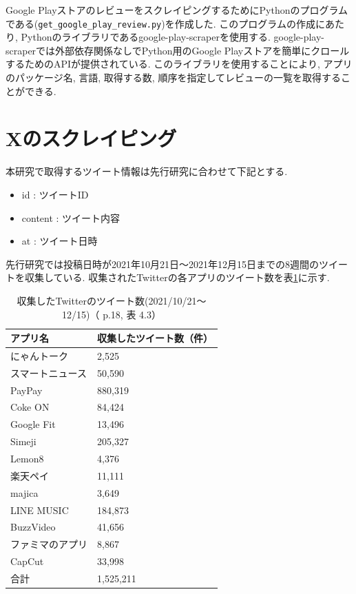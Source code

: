 Google PlayストアのレビューをスクレイピングするためにPythonのプログラムである(\verb|get_google_play_review.py|)を作成した. このプログラムの作成にあたり, Pythonのライブラリであるgoogle-play-scraperを使用する. google-play-scraperでは外部依存関係なしでPython用のGoogle Playストアを簡単にクロールするためのAPIが提供されている\cite{google-play-scraper}. 
このライブラリを使用することにより, アプリのパッケージ名, 言語, 取得する数, 順序を指定してレビューの一覧を取得することができる. 


\section{Xのスクレイピング}
\label{sec:x}
本研究で取得するツイート情報は先行研究\cite{kawatsura}に合わせて下記とする. 
\begin{itemize}
 \item id : ツイートID
 \item content : ツイート内容
 \item at : ツイート日時
\end{itemize}

先行研究では投稿日時が2021年10月21日〜2021年12月15日までの8週間のツイートを収集している. 収集されたTwitterの各アプリのツイート数を表\ref{tb:rawtweetnum}に示す. 

\begin{table}[htbp]
  \caption{収集したTwitterのツイート数(2021/10/21〜12/15)（\cite{kawatsura} p.18, 表 4.3）}
  \label{tb:rawtweetnum}
  \begin{center}
  \begin{tabular}{l|l}
    \hline
    アプリ名&収集したツイート数（件）\\\hline\hline
    にゃんトーク&2,525\\\hline
    スマートニュース&50,590\\\hline
    PayPay&880,319\\\hline
    Coke ON&84,424\\\hline
    Google Fit&13,496\\\hline
    Simeji&205,327\\\hline
    Lemon8&4,376\\\hline
    楽天ペイ&11,111\\\hline
    majica&3,649\\\hline
    LINE MUSIC&184,873\\\hline
    BuzzVideo&41,656\\\hline
    ファミマのアプリ&8,867\\\hline
    CapCut&33,998\\\hline\hline
    合計&1,525,211
  \end{tabular}\end{center}
\end{table}

